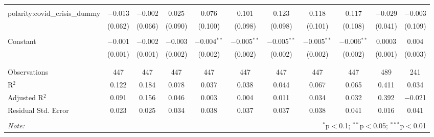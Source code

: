 \begin{table}[!htbp]
\begin{adjustbox}{width=1.25\textwidth}
\begin{tabular}{@{\extracolsep{5pt}}lcccccccccc}
  & & & & & & & & & & \\ 
 polarity:covid\_crisis\_dummy & $-$0.013 & $-$0.002 & 0.025 & 0.076 & 0.101 & 0.123 & 0.118 & 0.117 & $-$0.029 & $-$0.003 \\ 
  & (0.062) & (0.066) & (0.090) & (0.100) & (0.098) & (0.098) & (0.101) & (0.108) & (0.041) & (0.109) \\ 
  & & & & & & & & & & \\ 
 Constant & $-$0.001 & $-$0.002 & $-$0.003 & $-$0.004$^{**}$ & $-$0.005$^{**}$ & $-$0.005$^{**}$ & $-$0.005$^{**}$ & $-$0.006$^{**}$ & 0.0003 & 0.004 \\ 
  & (0.001) & (0.001) & (0.002) & (0.002) & (0.002) & (0.002) & (0.002) & (0.002) & (0.001) & (0.003) \\ 
  & & & & & & & & & & \\ 
\hline \\[-1.8ex] 
Observations & 447 & 447 & 447 & 447 & 447 & 447 & 447 & 447 & 489 & 241 \\ 
R$^{2}$ & 0.122 & 0.184 & 0.078 & 0.037 & 0.038 & 0.044 & 0.067 & 0.065 & 0.411 & 0.034 \\ 
Adjusted R$^{2}$ & 0.091 & 0.156 & 0.046 & 0.003 & 0.004 & 0.011 & 0.034 & 0.032 & 0.392 & $-$0.021 \\ 
Residual Std. Error & 0.023 & 0.025 & 0.034 & 0.038 & 0.037 & 0.037 & 0.038 & 0.041 & 0.016 & 0.041 \\ 
\hline 
\hline \\[-1.8ex] 
\textit{Note:}  & \multicolumn{10}{r}{$^{*}$p$<$0.1; $^{**}$p$<$0.05; $^{***}$p$<$0.01} \\ 
\end{tabular} 
\end{adjustbox} 
\end{table} 
